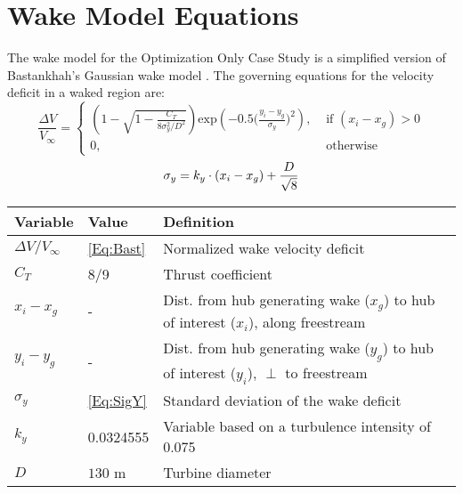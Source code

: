 \documentclass[10pt]{article}
\begin{document}
\section*{Wake Model Equations}
    The wake model for the Optimization Only Case Study is a simplified version of Bastankhah's Gaussian wake model \cite{Thomas2018}. The governing equations for the velocity deficit in a waked region are:\\
    \begin{equation}
        \frac{\Delta V}{V_{\infty}}
        =
        \begin{cases}
        \left(
            1 - \sqrt{
                1 - \frac{C_T}
                    {8\sigma_{y}^{2}/D^2}
                }
        \right)
                \text{exp}\left(
                    -0.5\Big(
                        \frac{y_{i}-y_{g}}{\sigma_{y}}
                    \Big)^2
                \right),
        & \text{ if } (x_i - x_g) > 0\\
        0, & \text{ otherwise }
        \end{cases}
        \label{Eq:Bast}
    \end{equation}
    \begin{equation}
        \sigma_y = k_y\cdot (x_{i}-x_{g}) + \frac{D}{\sqrt{8}} \\
        \label{Eq:SigY}
    \end{equation}
    \begin{center}
    \begin{tabular}{@{}lll@{}}
        \toprule
            Variable & Value & Definition \\ 
            \midrule
        $\Delta V / V_{\infty}$ & \cref{Eq:Bast} & Normalized wake velocity deficit \\ 
        $C_T$ & 8/9 & Thrust coefficient \\ 
        $x_{i}-x_{g}$ & - & Dist. from hub generating wake ($x_g$) to hub of interest ($x_i$), along freestream \\ 
        $y_{i}-y_{g}$ & - & Dist. from hub generating wake ($y_g$) to hub of interest ($y_i$), $\perp$ to freestream  \\ 
        $\sigma_y$ & \cref{Eq:SigY} & Standard deviation of the wake deficit \\ 
        $k_y$ & 0.0324555 & Variable based on a turbulence intensity of 0.075 \cite{Thomas2018, Niayifar2016} \\ 
        $D$ & $130$ m & Turbine diameter \cite{NREL335MW}\\
        \bottomrule
    \end{tabular}
    \end{center}
\end{document}
